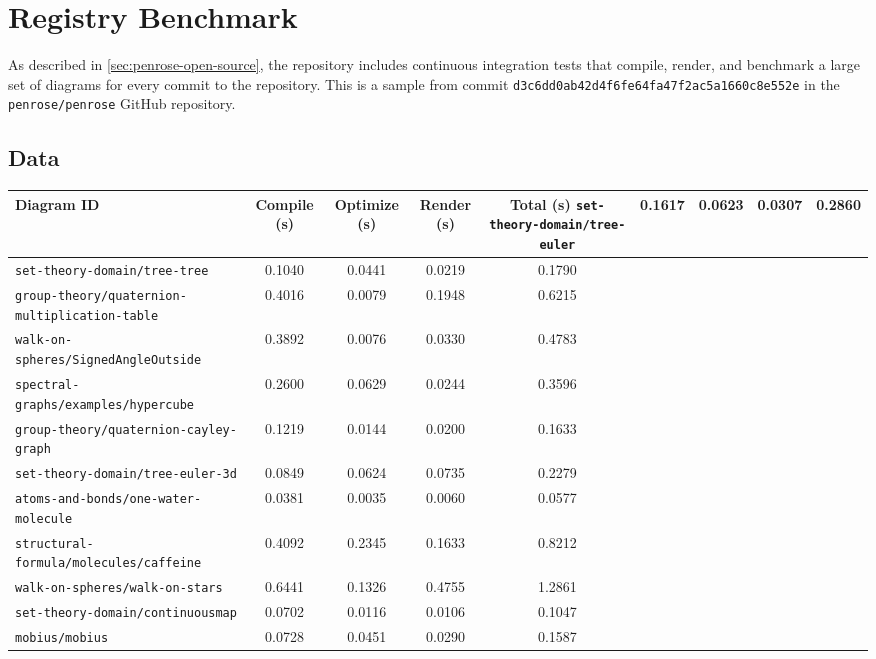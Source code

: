 \chapter{\Penrose{} Registry Benchmark}
\label{app:registry-benchmark}

As described in \cref{sec:penrose-open-source}, the \Penrose{} repository includes continuous integration tests that compile, render, and benchmark a large set of diagrams for every commit to the repository. This is a sample from commit \texttt{d3c6dd0ab42d4f6fe64fa47f2ac5a1660c8e552e} in the \texttt{penrose/penrose} GitHub repository.

\section{Data}
\begin{longtable}{|p{6.5cm}|c|c|c|c|}
    \hline
    \textbf{Diagram ID} & \textbf{Compile (s)} & \textbf{Optimize (s)} & \textbf{Render (s)} & \textbf{Total (s)} \endhead \hline
    \texttt{set-theory-domain/tree-euler} & 0.1617 & 0.0623 & 0.0307 & 0.2860 \\ \hline
    \texttt{set-theory-domain/tree-tree} & 0.1040 & 0.0441 & 0.0219 & 0.1790 \\ \hline
    \texttt{group-theory/quaternion-multiplication-table} & 0.4016 & 0.0079 & 0.1948 & 0.6215 \\ \hline
    \texttt{walk-on-spheres/SignedAngleOutside} & 0.3892 & 0.0076 & 0.0330 & 0.4783 \\ \hline
    \texttt{spectral-graphs/examples/hypercube} & 0.2600 & 0.0629 & 0.0244 & 0.3596 \\ \hline
    \texttt{group-theory/quaternion-cayley-graph} & 0.1219 & 0.0144 & 0.0200 & 0.1633 \\ \hline
    \texttt{set-theory-domain/tree-euler-3d} & 0.0849 & 0.0624 & 0.0735 & 0.2279 \\ \hline
    \texttt{atoms-and-bonds/one-water-molecule} & 0.0381 & 0.0035 & 0.0060 & 0.0577 \\ \hline
    \texttt{structural-formula/molecules/caffeine} & 0.4092 & 0.2345 & 0.1633 & 0.8212 \\ \hline
    \texttt{walk-on-spheres/walk-on-stars} & 0.6441 & 0.1326 & 0.4755 & 1.2861 \\ \hline
    \texttt{set-theory-domain/continuousmap} & 0.0702 & 0.0116 & 0.0106 & 0.1047 \\ \hline
    \texttt{mobius/mobius} & 0.0728 & 0.0451 & 0.0290 & 0.1587 \\ \hline

\end{longtable}
